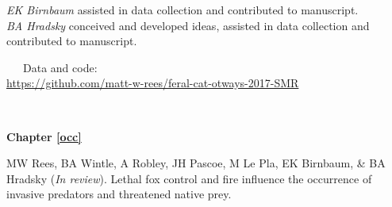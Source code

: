 \documentclass[11pt,a4paper,titlepage,twoside,openright]{style/unimelbthesis}
\begin{document}
\begin{frontmatter}
\begin{preface}
    \hspace*{0.333em}\hspace*{0.333em}\hspace*{0.333em}\hspace*{0.333em}\hspace*{0.333em}\hspace*{0.333em}\hspace*{0.333em}\hspace*{0.333em}\emph{EK Birnbaum} assisted in data collection and contributed to manuscript.\\
    \hspace*{0.333em}\hspace*{0.333em}\hspace*{0.333em}\hspace*{0.333em}\hspace*{0.333em}\hspace*{0.333em}\hspace*{0.333em}\hspace*{0.333em}\emph{BA Hradsky} conceived and developed ideas, assisted in data collection and contributed to manuscript.

    ~~~Data and code:\\
    \url{https://github.com/matt-w-rees/feral-cat-otways-2017-SMR}

    \(~\)

    \textbf{Chapter \ref{occ}}

    MW Rees, BA Wintle, A Robley, JH Pascoe, M Le Pla, EK Birnbaum, \& BA Hradsky (\emph{In review}). Lethal fox control and fire influence the occurrence of invasive predators and threatened native prey.


\end{preface}
\end{frontmatter}
\end{document}
